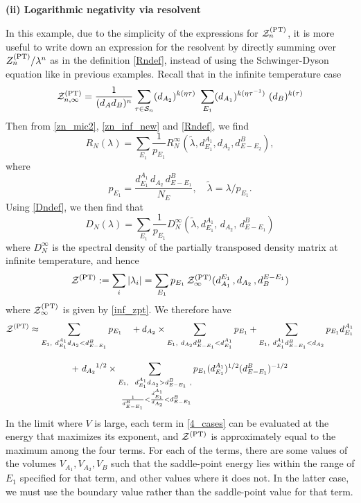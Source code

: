 \documentclass[a4paper,11pt]{article}
\newcommand{\be}{\begin{equation}}
\newcommand{\ee}{\end{equation}}
\newcommand\sS{{\mathcal S}}
\newcommand\sZ{{\mathcal Z}}
\begin{document}
\begin{enumerate}
\begin{appendix}
\noindent\textbf{(ii) Logarithmic negativity via resolvent} 

In this example, due to the simplicity of the expressions for $\sZ_n^{\rm (PT)}$, it is more useful to write down an expression for the resolvent by directly summing over $Z_n^{\rm(PT)}/\lambda^n$ as in the definition \eqref{Rndef}, instead of using the Schwinger-Dyson equation like in previous examples. 
Recall that in the infinite temperature case
\be 
\sZ_{n, \infty}^{\rm (PT)} = \frac{1}{(d_A d_B)^n}\sum_{\tau \in \sS_n}({d_{A_2}})^{k(\eta\tau)} ~ \sum_{E_1}(d_{A_1})^{k(\eta \tau^{-1})}~ (d_{B})^{k(\tau)} \label{zn_inf_new}
\ee
Then from \eqref{zn_mic2}, \eqref{zn_inf_new} and \eqref{Rndef}, we find 
\be 
R_N(\lambda) = \sum_{E_1} \frac{1}{p_{E_1}} R_N^{\infty}(\tilde{\lambda}, d^{A_1}_{E_1}, d_{A_2}, d^B_{E - E_2}), 
\label{r_mic}
\ee
where 
\be 
p_{E_1} = \frac{d^{A_1}_{E_1}\, d_{A_2} \, d^{B}_{E-E_1}}{N_E}, \quad \tilde{\lambda} = \lambda/p_{E_1}. 
\ee
Using \eqref{Dndef}, we then find that 
 \be 
 D_N(\lambda) = \sum_{E_1} \frac{1}{p_{E_1}} D_N^{\infty}(\tilde{\lambda}, d^{A_1}_{E_1},\, d_{A_2},\, d^B_{E - E_1})
 \ee
where $D_N^{\infty}$ is the spectral density of the partially transposed density matrix at infinite temperature, and hence 
\be 
\sZ^{\rm (PT)} := \sum_i |\lambda_i| = \sum_{E_1} p_{E_1}\, \sZ^{\rm (PT)}_{\infty}(d_{A_1}^{E_1}\, , d_{A_2}\, , d_B^{E- E_1})
\label{inf}
\ee
where $\sZ^{\rm (PT)}_{\infty}$ is given by \eqref{inf_zpt}. We therefore have
\be 
\begin{gathered} 
\sZ^{\rm (PT)} \approx \sum_{E_1, ~d^{A_1}_{E_1}d_{A_2}<d^B_{E- E_1}} p_{E_1} \quad + d_{A_2} \times \sum_{E_1, ~d_{A_2} d^{B}_{E-E_1}< d^{A_1}_{E_1}} p_{E_1} + \sum_{E_1, ~ d^{A_1}_{E_1} d^B_{E-E_1}< d_{A_2}} p_{E_1} d^{A_1}_{E_1} \\[10pt] + ~{d_{A_2}}^{1/2} \times \sum_{\substack{E_1,~~ d^{A_1}_{E_1}d_{A_2}>d^B_{E-E_1} ~,\\ ~ \frac{1}{d^B_{E-E_1}}<\frac{d^{A_1}_{E_1}}{d_{A_2}}< d^B_{E-E_1}}} p_{E_1} (d^{A_1}_{E_1})^{1/2} (d^{B}_{E-E_1})^{-1/2}
\label{4_cases}
\end{gathered} 
\ee 
In the limit where $V$ is large, each term in \eqref{4_cases} can be evaluated at the energy that maximizes its exponent, and $\sZ^{\rm(PT)}$ is approximately equal to the maximum among the four terms. For each of the terms, there are some values of the volumes $V_{A_1}, V_{A_2}, V_B$ such that the saddle-point energy lies within the range of $E_1$ specified for that term, and other values where it does not. In the latter case, we must use the boundary value rather than the saddle-point value for that term. 


\end{appendix}
\end{enumerate}
\end{document}
